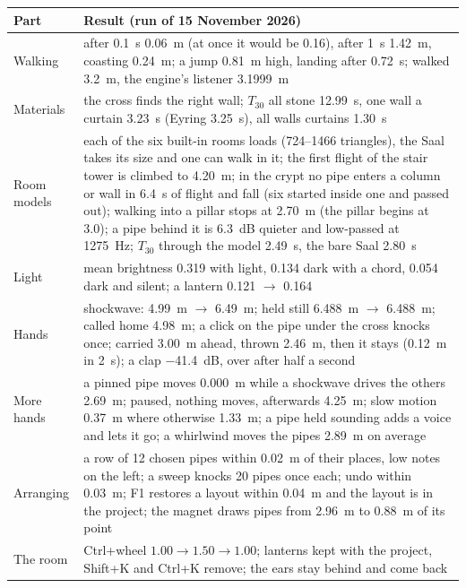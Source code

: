 \documentclass[11pt,a4paper,parskip=half,DIV=11,toc=bibliography]{scrartcl}
\begin{document}
\begin{table}[!htb]
\centering\small
\begin{tabularx}{\linewidth}{@{}lX@{}}
\toprule
Part & Result (run of 15 November 2026) \\
\midrule
Walking & after \SI{0.1}{s} \SI{0.06}{m} (at once it would be 0.16), after \SI{1}{s} \SI{1.42}{m}, coasting \SI{0.24}{m}; a jump \SI{0.81}{m} high, landing after \SI{0.72}{s}; walked \SI{3.2}{m}, the engine's listener \SI{3.1999}{m} \\
Materials & the cross finds the right wall; $T_{30}$ all stone \SI{12.99}{s}, one wall a curtain \SI{3.23}{s} (Eyring \SI{3.25}{s}), all walls curtains \SI{1.30}{s} \\
Room models & each of the six built-in rooms loads (724--1466 triangles), the Saal takes its size and one can walk in it; the first flight of the stair tower is climbed to \SI{4.20}{m}; in the crypt no pipe enters a column or wall in \SI{6.4}{s} of flight and fall (six started inside one and passed out); walking into a pillar stops at \SI{2.70}{m} (the pillar begins at 3.0); a pipe behind it is \SI{6.3}{dB} quieter and low-passed at \SI{1275}{Hz}; $T_{30}$ through the model \SI{2.49}{s}, the bare Saal \SI{2.80}{s} \\
Light & mean brightness 0.319 with light, 0.134 dark with a chord, 0.054 dark and silent; a lantern 0.121 $\rightarrow$ 0.164 \\
Hands & shockwave: \SI{4.99}{m} $\rightarrow$ \SI{6.49}{m}; held still \SI{6.488}{m} $\rightarrow$ \SI{6.488}{m}; called home \SI{4.98}{m}; a click on the pipe under the cross knocks once; carried \SI{3.00}{m} ahead, thrown \SI{2.46}{m}, then it stays (\SI{0.12}{m} in \SI{2}{s}); a clap \SI{-41.4}{dB}, over after half a second \\
More hands & a pinned pipe moves \SI{0.000}{m} while a shockwave drives the others \SI{2.69}{m}; paused, nothing moves, afterwards \SI{4.25}{m}; slow motion \SI{0.37}{m} where otherwise \SI{1.33}{m}; a pipe held sounding adds a voice and lets it go; a whirlwind moves the pipes \SI{2.89}{m} on average \\
Arranging & a row of 12 chosen pipes within \SI{0.02}{m} of their places, low notes on the left; a sweep knocks 20 pipes once each; undo within \SI{0.03}{m}; F1 restores a layout within \SI{0.04}{m} and the layout is in the project; the magnet draws pipes from \SI{2.96}{m} to \SI{0.88}{m} of its point \\
The room & Ctrl+wheel $1.00\rightarrow1.50\rightarrow1.00$; lanterns kept with the project, Shift+K and Ctrl+K remove; the ears stay behind and come back \\

\end{tabularx}
\end{table}
\end{document}
